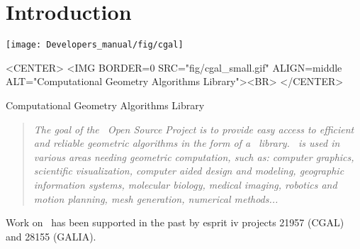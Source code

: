 
\chapter{Introduction\label{chap:intro}}

\begin{ccTexOnly}
\begin{center}
  \texttt{[image: Developers\_manual/fig/cgal]}
\end{center}
\end{ccTexOnly}

\begin{ccHtmlOnly}
<CENTER>
<IMG BORDER=0 SRC="fig/cgal_small.gif" 
  ALIGN=middle ALT="Computational Geometry Algorithms Library"><BR>
</CENTER>
\end{ccHtmlOnly}
\centerline{{\sc Computational Geometry Algorithms Library}}


\begin{quote}
{\em 
The goal of the \cgal\ Open Source Project is to provide easy access to efficient and reliable geometric algorithms in the form of a \CC\ library.
\cgal\ is used in various areas needing geometric computation, such
as: computer graphics, scientific visualization, computer aided design
and modeling, geographic information systems, molecular biology,
medical imaging, robotics and motion planning, mesh generation,
numerical methods...
%
}
\end{quote}

Work on \cgal\ has been supported in the past by {\sc esprit iv}
projects 21957 (CGAL) and 28155 (GALIA).








